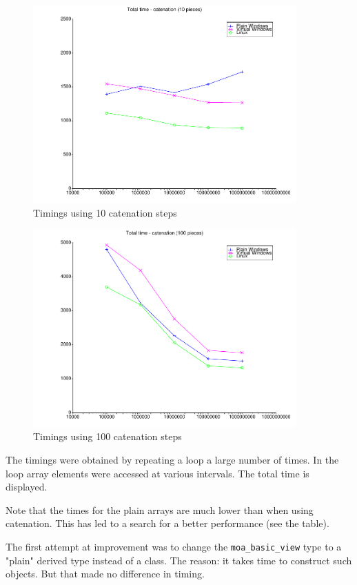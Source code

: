 \documentclass[onecolumn]{article}
\begin{document}
\begin{figure}
\includegraphics[width=0.9\textwidth]{total_view10.pdf}
\caption{Timings using 10 catenation steps}
\end{figure}

\begin{figure}
\includegraphics[width=0.9\textwidth]{total_view100.pdf}
\caption{Timings using 100 catenation steps}
\end{figure}

The timings were obtained by repeating a loop a large number of times. In the loop array elements
were accessed at various intervals. The total time is displayed.

Note that the times for the plain arrays are much lower than when using catenation. This has led to a
search for a better performance (see the table).

The first attempt at improvement was to change the \verb+moa_basic_view+ type to a "plain" derived type instead
of a class. The reason: it takes time to construct such objects. But that made no difference in timing.
\end{document}
